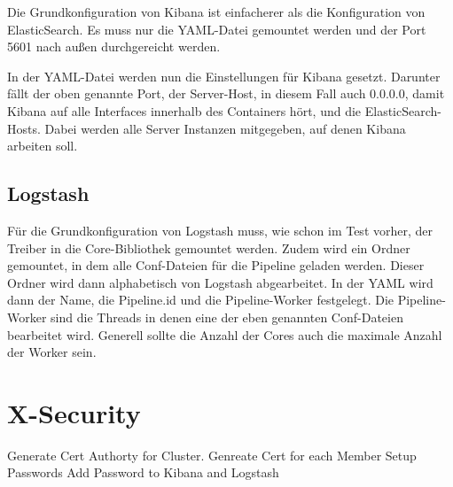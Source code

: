 Die Grundkonfiguration von Kibana ist einfacherer als die Konfiguration von ElasticSearch. Es muss nur die YAML-Datei gemountet werden und der Port 5601 nach außen durchgereicht werden.

In der YAML-Datei werden nun die Einstellungen für Kibana gesetzt. Darunter fällt der oben genannte Port, der Server-Host, in diesem Fall auch 0.0.0.0, damit Kibana auf alle Interfaces innerhalb des Containers hört, und die ElasticSearch-Hosts. Dabei werden alle Server Instanzen mitgegeben, auf denen Kibana arbeiten soll. 

\subsection{Logstash}

Für die Grundkonfiguration von Logstash muss, wie schon im Test vorher, der Treiber in die Core-Bibliothek gemountet werden. Zudem wird ein Ordner gemountet, in dem alle Conf-Dateien für die Pipeline geladen werden. Dieser Ordner wird dann alphabetisch von Logstash abgearbeitet. In der YAML wird dann der Name, die Pipeline.id und die Pipeline-Worker festgelegt. Die Pipeline-Worker sind die Threads in denen eine der eben genannten Conf-Dateien bearbeitet wird. Generell sollte die Anzahl der Cores auch die maximale Anzahl der Worker sein.


\section{X-Security}

Generate Cert Authorty for Cluster. Genreate Cert for each Member
Setup Passwords
Add Password to Kibana and Logstash



